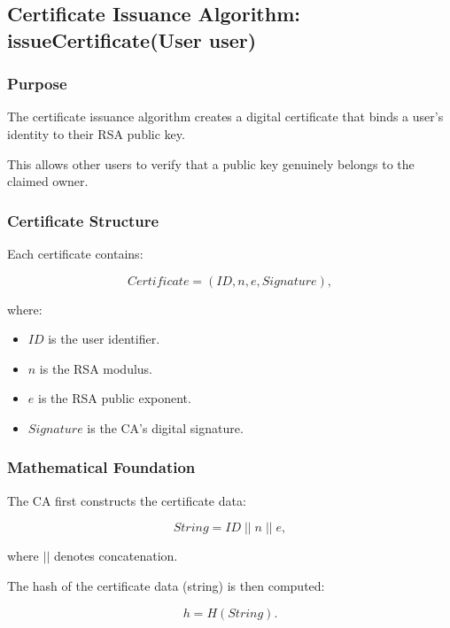 \documentclass[12pt]{article}
\begin{document}

\subsection{Certificate Issuance Algorithm: 
issueCertificate(User user)}

\subsubsection{Purpose}

The certificate issuance algorithm creates a digital certificate that binds a
user's identity to their RSA public key.

This allows other users to verify that a public key genuinely belongs to the
claimed owner.

\subsubsection{Certificate Structure}

Each certificate contains:

\begin{equation}
Certificate =
(ID,n,e,Signature),
\end{equation}

where:

\begin{itemize}
\item $ID$ is the user identifier.
\item $n$ is the RSA modulus.
\item $e$ is the RSA public exponent.
\item $Signature$ is the CA's digital signature.
\end{itemize}

\subsubsection{Mathematical Foundation}

The CA first constructs the certificate data:

\begin{equation}
String = ID \; || \; n \; || \; e,
\end{equation}

where $||$ denotes concatenation.

The hash of the certificate data (string) is then computed:

\begin{equation}
h = H(String).
\end{equation}
\end{document}
